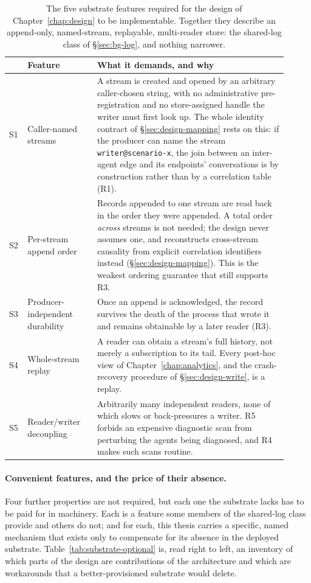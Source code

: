 \begin{table}[h]
\centering
\small
\begin{tabular}{@{}p{0.045\linewidth}p{0.235\linewidth}p{0.63\linewidth}@{}}
\toprule
& \textbf{Feature} & \textbf{What it demands, and why} \\
\midrule
S1 & Caller-named streams &
  A stream is created and opened by an arbitrary caller-chosen string, with
  no administrative pre-registration and no store-assigned handle the
  writer must first look up. The whole identity contract of
  \S\ref{sec:design-mapping} rests on this: if the producer can name the
  stream \texttt{writer@scenario-x}, the join between an inter-agent edge
  and its endpoints' conversations is by construction rather than by a
  correlation table (R1). \\
S2 & Per-stream append order &
  Records appended to one stream are read back in the order they were
  appended. A total order \emph{across} streams is not needed; the design
  never assumes one, and reconstructs cross-stream causality from explicit
  correlation identifiers instead (\S\ref{sec:design-mapping}). This is the
  weakest ordering guarantee that still supports R3. \\
S3 & Producer-independent durability &
  Once an append is acknowledged, the record survives the death of the
  process that wrote it and remains obtainable by a later reader (R3). \\
S4 & Whole-stream replay &
  A reader can obtain a stream's full history, not merely a subscription to
  its tail. Every post-hoc view of Chapter~\ref{chap:analytics}, and the
  crash-recovery procedure of \S\ref{sec:design-write}, is a replay. \\
S5 & Reader/writer decoupling &
  Arbitrarily many independent readers, none of which slows or
  back-pressures a writer. R5 forbids an expensive diagnostic scan from
  perturbing the agents being diagnosed, and R4 makes such scans routine. \\
\bottomrule
\end{tabular}
\caption[Required substrate features S1--S5]{The five substrate features
required for the design of Chapter~\ref{chap:design} to be implementable.
Together they describe an append-only, named-stream, replayable,
multi-reader store: the shared-log class of \S\ref{sec:bg-log}, and
nothing narrower.}
\label{tab:substrate-required}
\end{table}

\paragraph{Convenient features, and the price of their absence.} Four
further properties are not required, but each one the substrate lacks has to
be paid for in machinery. Each is a feature some members of the shared-log class
provide and others do not; and for each, this thesis carries a specific,
named mechanism that exists only to compensate for its absence in the
deployed substrate.
Table~\ref{tab:substrate-optional} is, read right to left, an inventory of
which parts of the design are contributions of the architecture and which
are workarounds that a better-provisioned substrate would delete.

